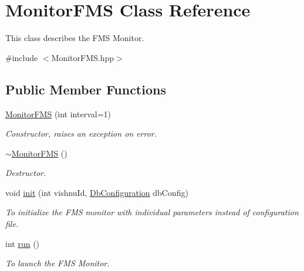 \hypertarget{classMonitorFMS}{
\section{MonitorFMS Class Reference}
\label{classMonitorFMS}
}


This class describes the FMS Monitor.  




{\ttfamily \#include $<$MonitorFMS.hpp$>$}

\subsection*{Public Member Functions}
\begin{DoxyCompactItemize}
\item 
\hyperlink{classMonitorFMS_ae070dde72ea132d5e40fdd3529ecb2b2}{MonitorFMS} (int interval=1)
\begin{DoxyCompactList}\small\item\em Constructor, raises an exception on error. \item\end{DoxyCompactList}\item 
\hypertarget{classMonitorFMS_af760fb718e4800208a0d675bade9e5da}{
\hyperlink{classMonitorFMS_af760fb718e4800208a0d675bade9e5da}{$\sim$MonitorFMS} ()}
\label{classMonitorFMS_af760fb718e4800208a0d675bade9e5da}

\begin{DoxyCompactList}\small\item\em Destructor. \item\end{DoxyCompactList}\item 
void \hyperlink{classMonitorFMS_a93ee1d437459fe2753114afb13466e2f}{init} (int vishnuId, \hyperlink{classDbConfiguration}{DbConfiguration} dbConfig)
\begin{DoxyCompactList}\small\item\em To initialize the FMS monitor with individual parameters instead of configuration file. \item\end{DoxyCompactList}\item 
int \hyperlink{classMonitorFMS_aa24d91ad05db4db09be6ea4fae2d05d1}{run} ()
\begin{DoxyCompactList}\small\item\em To launch the FMS Monitor. \item\end{DoxyCompactList}\end{DoxyCompactItemize}

